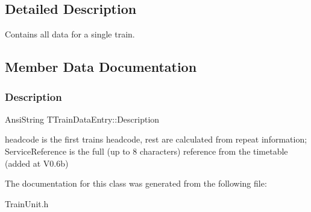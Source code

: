 \subsection{Detailed Description}
Contains all data for a single train. 

\subsection{Member Data Documentation}
\mbox{\label{class_t_train_data_entry_aea5870826c3c6815472e86d82b0c9fe7}} 
\subsubsection{\texorpdfstring{Description}{Description}}
{\footnotesize\ttfamily Ansi\+String T\+Train\+Data\+Entry\+::\+Description}

headcode is the first train\textquotesingle{}s headcode, rest are calculated from repeat information; Service\+Reference is the full (up to 8 characters) reference from the timetable (added at V0.\+6b) 

The documentation for this class was generated from the following file\+:\begin{DoxyCompactItemize}
\item 
Train\+Unit.\+h\end{DoxyCompactItemize}
